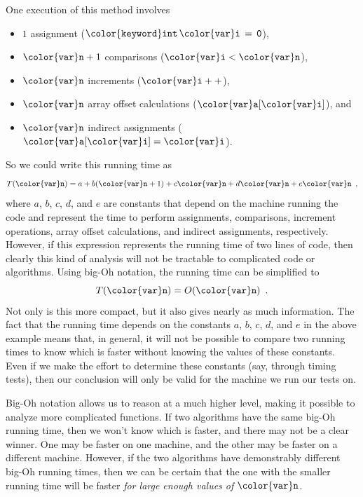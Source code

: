 \documentclass[10pt]{book}
\theoremstyle{plain}
\theoremstyle{definition}
\begin{document}
One execution of this method involves
\begin{itemize}
      \item $1$ assignment (\ensuremath{\mathtt{{\color{keyword}int}\, {\color{var}i}\, =\, 0}}),
      \item $\ensuremath{\mathtt{{\color{var}n}}}+1$ comparisons (\ensuremath{\mathtt{{\color{var}i} < {\color{var}n}}}),
      \item \ensuremath{\mathtt{{\color{var}n}}} increments (\ensuremath{\mathtt{{\color{var}i}++}}),
      \item \ensuremath{\mathtt{{\color{var}n}}} array offset calculations (\ensuremath{\mathtt{{\color{var}a}[{\color{var}i}]}}), and
      \item \ensuremath{\mathtt{{\color{var}n}}} indirect assignments (\ensuremath{\mathtt{{\color{var}a}[{\color{var}i}] = {\color{var}i}}}).
\end{itemize}
So we could write this running time as
\[
    T(\ensuremath{\mathtt{{\color{var}n}}})=a + b(\ensuremath{\mathtt{{\color{var}n}}}+1) + c\ensuremath{\mathtt{{\color{var}n}}} + d\ensuremath{\mathtt{{\color{var}n}}} + e\ensuremath{\mathtt{{\color{var}n}}} \enspace , 
\]
where $a$, $b$, $c$, $d$, and $e$ are constants that depend on the
machine running the code and represent the time to perform assignments,
comparisons, increment operations, array offset calculations, and indirect
assignments, respectively.  However, if this expression represents the
running time of two lines of code, then clearly this kind of analysis
will not be tractable to complicated code or algorithms.  Using big-Oh
notation, the running time can be simplified to
\[
    T(\ensuremath{\mathtt{{\color{var}n}}})= O(\ensuremath{\mathtt{{\color{var}n}}}) \enspace .
\]
Not only is this more compact, but it also gives nearly as much
information.  The fact that the running time depends on the constants $a$,
$b$, $c$, $d$, and $e$ in the above example means that, in general, it
will not be possible to compare two running times to know which is faster
without knowing the values of these constants.  Even if we make the
effort to determine these constants (say, through timing tests), then
our conclusion will only be valid for the machine we run our tests on.

Big-Oh notation allows us to reason at a much higher level, making
it possible to analyze more complicated functions.  If two algorithms
have the same big-Oh running time, then we won't know which is faster,
and there may not be a clear winner.  One may be faster on one machine,
and the other may be faster on a different machine.  However, if the
two algorithms have demonstrably different big-Oh running times, then
we can be certain that the one with the smaller running time will be
faster \emph{for large enough values of \ensuremath{\mathtt{{\color{var}n}}}}.
\end{document}
